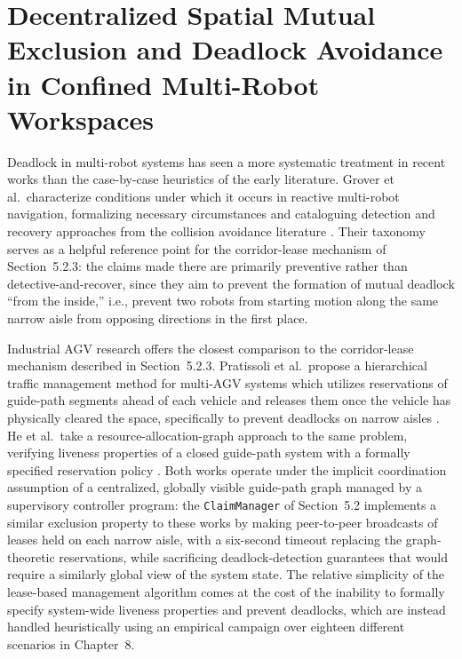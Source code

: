 \section{Decentralized Spatial Mutual Exclusion and Deadlock Avoidance in Confined Multi-Robot Workspaces}

Deadlock in multi-robot systems has seen a more systematic treatment in recent works than the case-by-case heuristics of the early literature. Grover et al.\ characterize conditions under which it occurs in reactive multi-robot navigation, formalizing necessary circumstances and cataloguing detection and recovery approaches from the collision avoidance literature \cite{grover2023deadlock}. Their taxonomy serves as a helpful reference point for the corridor-lease mechanism of Section~5.2.3: the claims made there are primarily preventive rather than detective-and-recover, since they aim to prevent the formation of mutual deadlock ``from the inside,'' i.e., prevent two robots from starting motion along the same narrow aisle from opposing directions in the first place.

Industrial AGV research offers the closest comparison to the corridor-lease mechanism described in Section~5.2.3. Pratissoli et al.\ propose a hierarchical traffic management method for multi-AGV systems which utilizes reservations of guide-path segments ahead of each vehicle and releases them once the vehicle has physically cleared the space, specifically to prevent deadlocks on narrow aisles \cite{pratissoli2024hierarchical}. He et al.\ take a resource-allocation-graph approach to the same problem, verifying liveness properties of a closed guide-path system with a formally specified reservation policy \cite{he2023deadlock}. Both works operate under the implicit coordination assumption of a centralized, globally visible guide-path graph managed by a supervisory controller program: the \texttt{ClaimManager} of Section~5.2 implements a similar exclusion property to these works by making peer-to-peer broadcasts of leases held on each narrow aisle, with a six-second timeout replacing the graph-theoretic reservations, while sacrificing deadlock-detection guarantees that would require a similarly global view of the system state. The relative simplicity of the lease-based management algorithm comes at the cost of the inability to formally specify system-wide liveness properties and prevent deadlocks, which are instead handled heuristically using an empirical campaign over eighteen different scenarios in Chapter~8.

